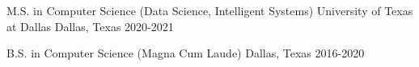 


\begin{cventries}


\cventry
{M.S. in Computer Science (Data Science, Intelligent Systems)} %
{University of Texas at Dallas} %
{Dallas, Texas} %
{2020-2021} %
{}


\cventry
{B.S. in Computer Science (Magna Cum Laude)} %
{\hphantom{University of Texas at Dallas}} %
{Dallas, Texas} %
{2016-2020} %
{}


\end{cventries}